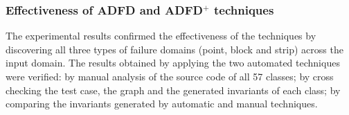 \documentclass[runningheads,a4paper]{llncs}
\def\rot{\rotatebox}
\begin{document}



				 
				 
				 
				 




\subsubsection{Effectiveness of ADFD and ADFD$^+$ techniques}
The experimental results confirmed the effectiveness of the techniques by discovering all three types of failure domains (point, block and strip) across the input domain. The results obtained by applying the two automated techniques were verified: by manual analysis of the source code of all 57 classes; by cross checking the test case, the graph and the generated invariants of each class; by comparing the invariants generated by automatic and manual techniques. 
\end{document}
